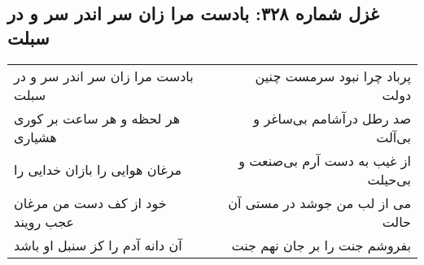 \begin{center}
\section*{غزل شماره ۳۲۸: بادست مرا زان سر اندر سر و در سبلت}
\label{sec:0328}
\begin{longtable}{l p{0.5cm} r}
بادست مرا زان سر اندر سر و در سبلت
&&
پرباد چرا نبود سرمست چنین دولت
\\
هر لحظه و هر ساعت بر کوری هشیاری
&&
صد رطل درآشامم بی‌ساغر و بی‌آلت
\\
مرغان هوایی را بازان خدایی را
&&
از غیب به دست آرم بی‌صنعت و بی‌حیلت
\\
خود از کف دست من مرغان عجب رویند
&&
می از لب من جوشد در مستی آن حالت
\\
آن دانه آدم را کز سنبل او باشد
&&
بفروشم جنت را بر جان نهم جنت
\\
\end{longtable}
\end{center}
